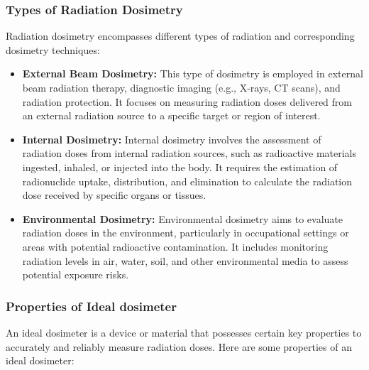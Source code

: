 \documentclass[../../Report.tex]{subfiles}
\begin{document}
    \subsubsection*{\large Types of Radiation Dosimetry}
        Radiation dosimetry encompasses different types of radiation and corresponding dosimetry techniques:
        \begin{itemize}
            \item \textbf{External Beam Dosimetry: } This type of dosimetry is employed in external beam radiation 
            therapy, diagnostic imaging (e.g., X-rays, CT scans), and radiation protection. It focuses on measuring 
            radiation doses delivered from an external radiation source to a specific target or region of interest.

            \item \textbf{Internal Dosimetry: } Internal dosimetry involves the assessment of radiation doses from 
            internal radiation sources, such as radioactive materials ingested, inhaled, or injected into the body. 
            It requires the estimation of radionuclide uptake, distribution, and elimination to calculate the radiation 
            dose received by specific organs or tissues.

            \item \textbf{Environmental Dosimetry: } Environmental dosimetry aims to evaluate radiation doses in the 
            environment, particularly in occupational settings or areas with potential radioactive contamination. It 
            includes monitoring radiation levels in air, water, soil, and other environmental media to assess potential 
            exposure risks.

        \end{itemize}

    \subsubsection*{\large Properties of Ideal dosimeter}
        An ideal dosimeter is a device or material that possesses certain key properties to accurately and 
        reliably measure radiation doses. Here are some properties of an ideal dosimeter\cite{b7}:
\end{document}
